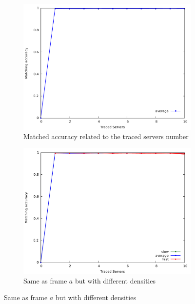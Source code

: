 \begin{figure}[H]
\begin{subfigure}{.5\textwidth}
		\centering
		\includegraphics[width=1\linewidth]{graphs/s_server_pmatch_average_only.pdf}
		\caption{Matched accuracy related to the traced servers number}
		\label{fig:g_maccuracya}
	\end{subfigure} 
	\begin{subfigure}{.5\textwidth}
		\centering
		\includegraphics[width=1\linewidth]{graphs/s_server_pmatch.pdf}
		\caption{Same as frame $a$ but with different densities}
		\label{fig:g_maccuracyb}
	\end{subfigure}


\end{figure}
